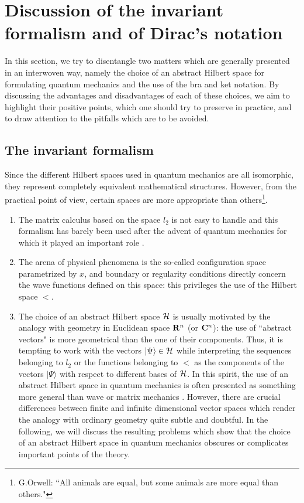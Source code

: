\documentclass[12pt]{report}
\begin{document}
 
 
 
 
\chapter{Discussion of the invariant formalism 
and of Dirac's notation}

In this section, we try to disentangle two matters
which are generally presented in an interwoven way, 
namely the choice of an abstract Hilbert space 
for formulating quantum mechanics
and 
the use of the bra and ket notation.
By discussing the advantages and disadvantages
of each of these choices, we aim to 
highlight their positive points, which one should try 
to preserve in practice, and 
to draw attention to the pitfalls 
which are to be avoided.  


\section{The invariant formalism}

Since the different Hilbert spaces used in quantum mechanics
are all isomorphic, they represent  
completely equivalent mathematical structures. 
However, from the practical point of view, certain spaces are 
more appropriate than others\footnote{G.Orwell:
``All animals are equal, but some animals are more equal
than others."}.
\begin{enumerate}
\item
The matrix calculus based on the space $l_2$
is not easy to handle and this formalism has barely been used after 
the advent of quantum mechanics for which it played an 
important role \cite{vdw}.
\item
The arena of physical phenomena is the so-called 
configuration space parametrized by $x$, and boundary or regularity
conditions directly concern the 
wave functions defined on this space: 
this privileges the use of the Hilbert space $\lt$. 
\item
The choice of an abstract Hilbert space ${\cal H}$ is usually motivated by  
the analogy with geometry in Euclidean space 
${\bf R}^n$ (or ${\bf C}^n$): the use of ``abstract vectors" is more geometrical
than the one of their components. Thus, it is tempting to work with the 
vectors $ | \Psi \rangle \in {\cal H}$
while interpreting the sequences belonging to $l_2$ or the functions 
belonging to $\lt$ as the components of the vectors 
$|\Psi \rangle $ with respect to different bases of ${\cal H}$.
In this spirit, the use of an abstract Hilbert space in quantum mechanics 
is often presented as something  more general than wave or matrix mechanics 
\cite{ct}.
However, there are crucial differences between finite and
infinite dimensional vector spaces which render the analogy with 
ordinary geometry quite subtle and doubtful.  
In the following, we will discuss the resulting problems 
which show that the choice of an abstract Hilbert space in 
quantum mechanics obscures or complicates 
important points of the theory. 
\end{enumerate}
 
\end{document}
